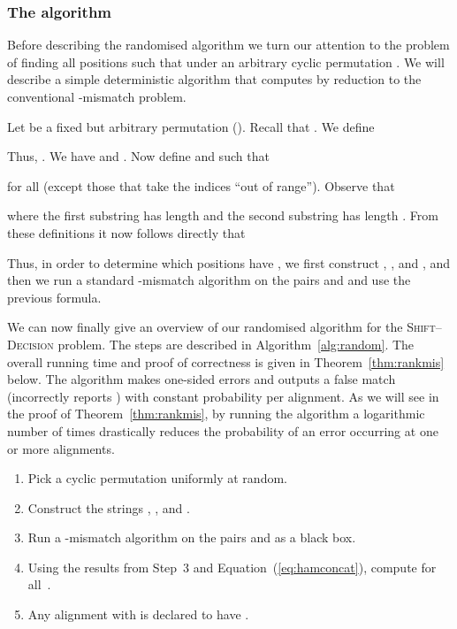 \documentclass[11pt]{article}
\newcommand{\skDecision}{\textsc{Shift--Decision}\xspace}
\theoremstyle{plain}
\theoremstyle{definition}
\begin{document}
\subsubsection{The algorithm}

Before describing the randomised algorithm we turn our attention to the problem of finding all positions  such that  under an arbitrary cyclic permutation . We will describe a simple deterministic algorithm that computes  by reduction to the conventional -mismatch problem.

Let  be a fixed but arbitrary permutation (). Recall that . We define

Thus, . We have  and . Now define  and  such that

for all  (except those that take the indices ``out of range''). Observe that

where the first substring has length  and the second substring has length . From these definitions it now follows directly that

Thus, in order to determine which positions  have , we first construct , ,  and , and then we run a standard -mismatch algorithm on the pairs  and  and use the previous formula.

We can now finally give an overview of our randomised algorithm for the \skDecision problem. The steps are described in Algorithm~\ref{alg:random}. The overall running time and proof of correctness is given in Theorem~\ref{thm:rankmis} below. The algorithm makes one-sided errors and outputs a false match (incorrectly reports ) with constant probability per alignment. As we will see in the proof of Theorem~\ref{thm:rankmis}, by running the algorithm a logarithmic number of times drastically reduces the probability of an error occurring at one or more alignments.

\begin{algorithm}[t]
    \caption{Overview of randomised solution to \skDecision.
        \label{alg:random}}
    \begin{enumerate}
        \item Pick a cyclic permutation  uniformly at random.
        \item Construct the strings , ,  and .
        \item Run a -mismatch algorithm on the pairs  and  as a black box.
        \item Using the results from Step~3 and Equation~(\ref{eq:hamconcat}), compute  for all~.
        \item Any alignment  with  is declared to have .
    \end{enumerate}
    \vspace{-8pt}
\end{algorithm}
\end{document}
